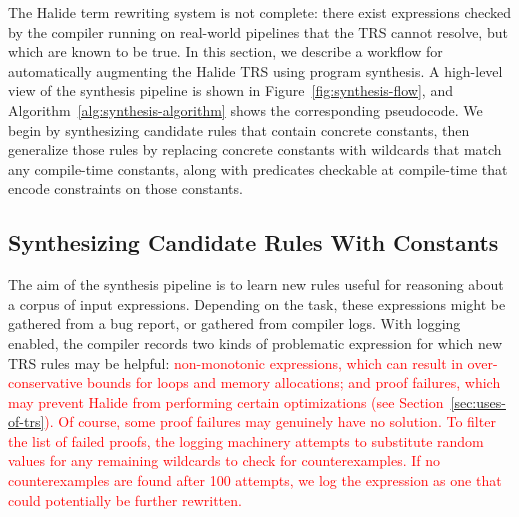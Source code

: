 \documentclass[acmsmall,review]{acmart}\settopmatter{printfolios=true,printccs=false,printacmref=false}
\newcommand{\modified}[1]{\textcolor{red}{{#1}}}
\begin{document}
The Halide term rewriting system is not complete: there
exist expressions checked by the compiler running on real-world pipelines that
the TRS cannot resolve, but which are known to be true. 
In this section, we describe a workflow for automatically augmenting the Halide
TRS using program synthesis.
A high-level view of the synthesis pipeline is shown in Figure~\ref{fig:synthesis-flow},
and Algorithm~\ref{alg:synthesis-algorithm} shows the corresponding pseudocode.
We begin by synthesizing candidate rules that contain concrete constants,
then generalize those rules by replacing concrete constants with wildcards that
match any compile-time constants, along with predicates checkable at compile-time
that encode constraints on those constants.

\subsection{Synthesizing Candidate Rules With Constants}
\label{sec:synthesizing-candidate-rules}

The aim of the synthesis pipeline is to learn new rules useful for
reasoning about a corpus of input expressions. Depending on the task,
these expressions might be gathered from a bug report, or gathered
from compiler logs. With logging enabled, the compiler records two
kinds of problematic expression for which new TRS rules may be helpful:
\modified{non-monotonic expressions, which can result in over-conservative
bounds for loops and memory allocations; and proof failures,
which may prevent Halide from performing certain optimizations
(see Section~\ref{sec:uses-of-trs}). Of course, some proof failures may genuinely have
no solution. To filter the list of failed proofs,
the logging machinery attempts to substitute random values for any remaining
wildcards to check for counterexamples. If no counterexamples are found after 100
attempts, we log the expression as one that could potentially be further rewritten.}
\end{document}
